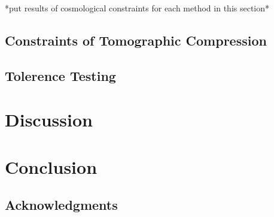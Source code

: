 \documentclass[twocolumn]{\docclass}
\begin{document}
*put results of cosmological constraints for each method in this section*

\subsection{Constraints of Tomographic Compression}





\subsection{Tolerence Testing}






\section{Discussion}
\label{sec:discussion}




\section{Conclusion}
\label{sec:conclusion}




\subsection*{Acknowledgments}











\end{document}
